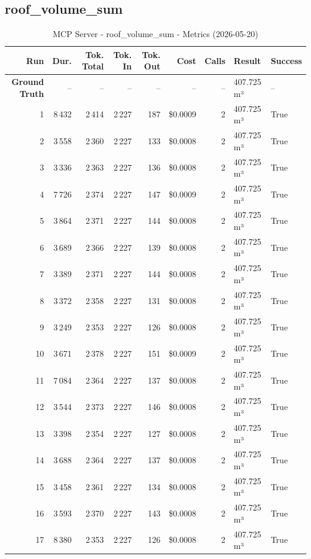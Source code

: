 \documentclass[a4paper,11pt]{article}
\begin{document}
\clearpage
\subsection{roof\_volume\_sum}

\begin{table}[ht]
\centering
\scriptsize
\caption{MCP Server - roof\_volume\_sum - Metrics (2026-05-20)}
\label{tab:mcp\_roof\_volume\_sum\_metrics\_2026-05-20}
\begin{tabular}{r r r r r r r p{3cm} l}
\hline
Run & Dur. & Tok. Total & Tok. In & Tok. Out & Cost & Calls & Result & Success \\
\hline
\textbf{Ground Truth} & -- & -- & -- & -- & -- & -- & 407.725 m³ & -- \\
\hline
1 & 8\,432 & 2\,414 & 2\,227 & 187 & \$0.0009 & 2 & 407.725 m³ & True \\
2 & 3\,558 & 2\,360 & 2\,227 & 133 & \$0.0008 & 2 & 407.725 m³ & True \\
3 & 3\,336 & 2\,363 & 2\,227 & 136 & \$0.0008 & 2 & 407.725 m³ & True \\
4 & 7\,726 & 2\,374 & 2\,227 & 147 & \$0.0009 & 2 & 407.725 m³ & True \\
5 & 3\,864 & 2\,371 & 2\,227 & 144 & \$0.0008 & 2 & 407.725 m³ & True \\
6 & 3\,689 & 2\,366 & 2\,227 & 139 & \$0.0008 & 2 & 407.725 m³ & True \\
7 & 3\,389 & 2\,371 & 2\,227 & 144 & \$0.0008 & 2 & 407.725 m³ & True \\
8 & 3\,372 & 2\,358 & 2\,227 & 131 & \$0.0008 & 2 & 407.725 m³ & True \\
9 & 3\,249 & 2\,353 & 2\,227 & 126 & \$0.0008 & 2 & 407.725 m³ & True \\
10 & 3\,671 & 2\,378 & 2\,227 & 151 & \$0.0009 & 2 & 407.725 m³ & True \\
11 & 7\,084 & 2\,364 & 2\,227 & 137 & \$0.0008 & 2 & 407.725 m³ & True \\
12 & 3\,544 & 2\,373 & 2\,227 & 146 & \$0.0008 & 2 & 407.725 m³ & True \\
13 & 3\,398 & 2\,354 & 2\,227 & 127 & \$0.0008 & 2 & 407.725 m³ & True \\
14 & 3\,688 & 2\,364 & 2\,227 & 137 & \$0.0008 & 2 & 407.725 m³ & True \\
15 & 3\,458 & 2\,361 & 2\,227 & 134 & \$0.0008 & 2 & 407.725 m³ & True \\
16 & 3\,593 & 2\,370 & 2\,227 & 143 & \$0.0008 & 2 & 407.725 m³ & True \\
17 & 8\,380 & 2\,353 & 2\,227 & 126 & \$0.0008 & 2 & 407.725 m³ & True \\

\end{tabular}
\end{table}
\end{document}
